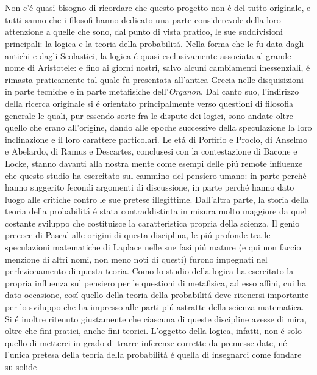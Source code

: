 \documentclass[a4paper,10pt]{book}
\begin{document}
\section{}
Non c'\'{e} quasi bisogno di ricordare che questo progetto non \'{e} del tutto originale, e tutti sanno che i filosofi hanno dedicato una parte considerevole della loro attenzione
a quelle che sono, dal punto di vista pratico, le sue suddivisioni principali: la logica e la teoria della probabilit\'{a}. Nella forma che le fu data dagli antichi e dagli Scolastici,
la logica \'{e} quasi esclusivamente associata al grande nome di Aristotele: e fino ai giorni nostri, salvo alcuni cambiamenti inessenziali, \'{e} rimasta praticamente tal quale fu
presentata all'antica Grecia nelle disquisizioni in parte tecniche e in parte metafisiche dell'\textit{Organon}. Dal canto suo, l'indirizzo della ricerca originale si \'{e} orientato
principalmente verso questioni di filosofia generale le quali, pur essendo sorte fra le dispute dei logici, sono andate oltre quello che erano all'origine, dando alle epoche successive
della speculazione la loro inclinazione e il loro carattere particolari. Le et\'{a} di Porfirio e Proclo, di Anselmo e Abelardo, di Ramus e Descartes, conclusesi con la contestazione
di Bacone e Locke, stanno davanti alla nostra mente come esempi delle pi\'{u} remote influenze che questo studio ha esercitato sul cammino del pensiero umano: in parte perch\'{e} hanno
suggerito fecondi argomenti di discussione, in parte perch\'{e} hanno dato luogo alle critiche contro le sue pretese illegittime. Dall'altra parte, la storia della teoria della
probabilit\'{a} \'{e} stata contraddistinta in misura molto maggiore da quel costante sviluppo che costituisce la caratteristica propria della scienza. Il genio precoce di Pascal alle origini
di questa disciplina, le pi\'{u} profonde tra le speculazioni matematiche di Laplace nelle sue fasi pi\'{u} mature (e qui non faccio menzione di altri nomi, non meno noti di questi)
furono impegnati nel perfezionamento di questa teoria. Como lo studio della logica ha esercitato la propria influenza sul pensiero per le questioni di metafisica, ad esso affini,
cui ha dato occasione, cos\'{i} quello della teoria della probabilit\'{a} deve ritenersi importante per lo sviluppo che ha impresso alle parti pi\'{u} astratte della scienza matematica.
Si \'{e} inoltre ritenuto giustamente che ciascuna di queste discipline avesse di mira, oltre che fini pratici, anche fini teorici. L'oggetto della logica, infatti, non \'{e} solo
quello di metterci in grado di trarre inferenze corrette da premesse date, n\'{e} l'unica pretesa della teoria della probabilit\'{a} \'{e} quella di insegnarci come fondare su solide
\end{document}
